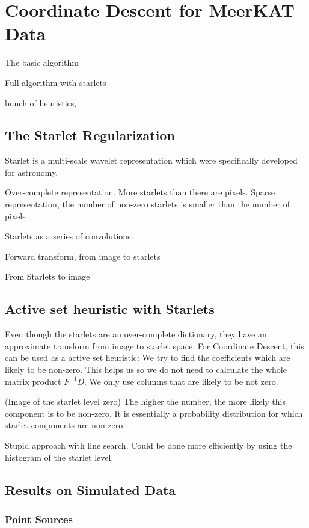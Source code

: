 \section{Coordinate Descent for MeerKAT Data}
The basic algorithm

Full algorithm with starlets

bunch of heuristics, 

\subsection{The Starlet Regularization}
Starlet is a multi-scale wavelet representation which were specifically developed for astronomy.

Over-complete representation. More starlets than there are pixels. Sparse representation, the number of non-zero starlets is smaller than the number of pixels

Starlets as a series of convolutions.

Forward transform, from image to starlets

From Starlets to image

\subsection{Active set heuristic with Starlets}
Even though the starlets are an over-complete dictionary, they have an approximate transform from image to starlet space. For Coordinate Descent, this can be used as a active set heuristic: We try to find the coefficients which are likely to be non-zero. This helps us so we do not need to calculate the whole matrix product $F^{-1}D$. We only use columns that are likely to be not zero.

(Image of the starlet level zero)
The higher the number, the more likely this component is to be non-zero. It is essentially a probability distribution for which starlet components are non-zero.

Stupid approach with line search. Could be done more efficiently by using the histogram of the starlet level.

\subsection{Results on Simulated Data}

\subsubsection{Point Sources}

